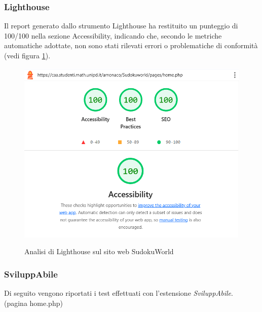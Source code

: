 \subsubsection{Lighthouse}
\noindent Il report generato dallo strumento Lighthouse ha restituito un punteggio di 100/100 nella sezione Accessibility, indicando che, secondo le metriche automatiche adottate, non sono stati rilevati errori o problematiche di conformità (vedi figura \ref{fig:Lighthouse_sudoku}).
\begin{figure}[H]
    \centering
    \includegraphics[width=0.7\linewidth, alt={Screenshot dell'analisi di Lighthouse sul sito web SudokuWorld}]{img/Lighthouse_sudoku.png}
    \caption{Analisi di Lighthouse sul sito web SudokuWorld}\label{fig:Lighthouse_sudoku}
\end{figure}

\subsubsection{SviluppAbile}
\noindent Di seguito vengono riportati i test effettuati con l'estensione \textit{SviluppAbile}. \newline
\\ \vspace{-0.5cm}
\noindent(pagina home.php)
